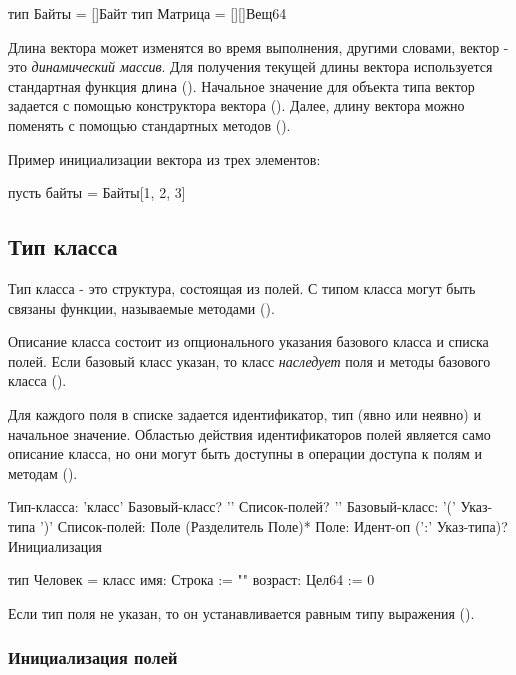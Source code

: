 \begin{Trivil}
тип Байты = []Байт
тип Матрица = [][]Вещ64
\end{Trivil}

Длина вектора может изменятся во время выполнения, другими словами, вектор - это \emph{динамический массив}. Для получения текущей длины вектора используется стандартная функция \verb|длина| ().
Начальное значение для объекта типа вектор задается с помощью конструктора вектора (). Далее, длину вектора можно поменять с помощью стандартных методов ().

Пример инициализации вектора из трех элементов:
\begin{Trivil}[vspace=2pt]
пусть байты = Байты[1, 2, 3]
\end{Trivil}

\hypertarget{class-types}{%
\subsection{Тип класса}\label{decls:class-types}}

Тип класса - это структура, состоящая из полей. С типом класса могут быть связаны функции, называемые методами ().

Описание класса состоит из опционального указания базового класса и списка полей. 
Если базовый класс указан, то класс \emph{наследует} поля и методы базового класса (). 

Для каждого поля в списке задается идентификатор, тип (явно или неявно) и начальное значение.
Областью действия идентификаторов полей является само описание класса, но они могут быть доступны в операции доступа к полям и методам ().

\begin{Grammar}
Тип-класса:  'класс' Базовый-класс? '{' Список-полей? '}'
Базовый-класс: '(' Указ-типа ')'
Список-полей: Поле (Разделитель Поле)*
Поле: Идент-оп (':' Указ-типа)? Инициализация
\end{Grammar} 

\begin{Trivil}
тип Человек = класс {
    имя: Строка := ""
    возраст: Цел64 := 0
}
\end{Trivil}

Если тип поля не указан, то он устанавливается равным типу выражения ().

\hypertarget{fields-init}{%
\subsubsection{Инициализация полей}\label{decls:fields-init}}

